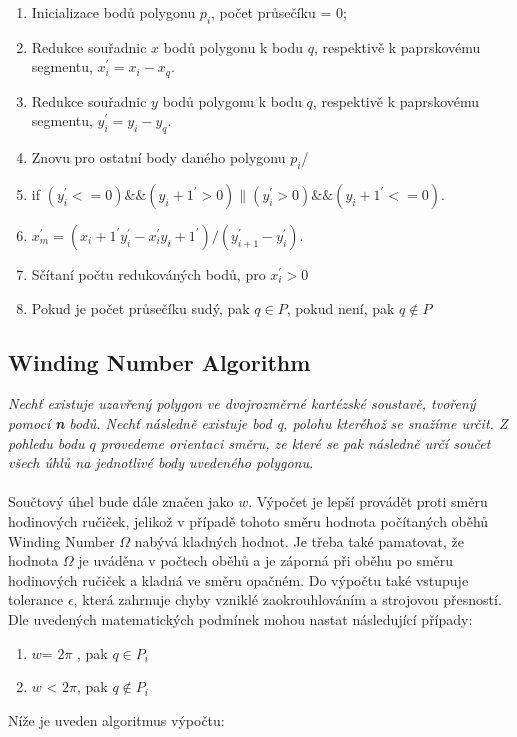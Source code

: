 \documentclass{article}
\begin{document}
\begin{enumerate} 

\item Inicializace bodů polygonu $p_i$, počet průsečíku = 0;

\item Redukce souřadnic $x$ bodů polygonu k bodu $q$,  respektivě k paprskovému segmentu, $x_i^{'} = x_i - x_q$. 

\item  Redukce souřadnic $y$ bodů polygonu k bodu $q$, respektivě k paprskovému segmentu, $y_i^{'} = y_i - y_q$. 

\item Znovu pro ostatní body daného polygonu $p_i$/ 

\item if $(y_{i}^{'} <= 0)\&\&(y_i+1^{'} > 0)\|(y_{i}^{'} > 0)\&\&(y_i+1^{'} <= 0)$. 

\item $x_m^{'} = (x_i+1^{'}y_{i}^{'}-x_{i}^{'}y_i+1^{'})/(y_{i+1}^{'}-y_{i}^{'})$. 

\item Sčítaní počtu redukováných bodů, pro $x_i^{'} > 0$  


\item Pokud je počet průsečíku sudý, pak $q \in P$, pokud není, pak  $q \notin P$ 

\end{enumerate} 
\clearpage
\newpage 

\subsection{Winding Number Algorithm} 
\textsl{Nechť existuje uzavřený polygon ve dvojrozměrné kartézské soustavě, tvořený pomocí \textbf n bodů. Nechť následně existuje bod q, polohu kteréhož se snažíme určit. Z pohledu bodu $q$ provedeme orientaci směru, ze které se pak následně určí součet všech úhlů na jednotlivé body uvedeného polygonu.}
\\
\\
Součtový úhel bude dále značen jako $w$. Výpočet je lepší provádět proti směru hodinových ručiček, jelikož v případě tohoto směru hodnota počítaných oběhů Winding Number $\Omega$  nabývá kladných hodnot. Je třeba také pamatovat, že hodnota $\Omega$ je uváděna v počtech oběhů a je záporná při oběhu po směru 
hodinových ručiček a kladná ve směru opačném. Do výpočtu také vstupuje tolerance $\epsilon$, která zahrnuje chyby vzniklé zaokrouhlováním a strojovou přesností. Dle uvedených matematických podmínek mohou nastat následující případy:
\begin{enumerate} 
\item $w$= $2\pi$ , pak $q \in P_i$ 
\item  $w$ < $2\pi$, pak $q  { \not \in }  P_i$
\end{enumerate}
 Níže je uveden algoritmus výpočtu: 
\end{document}
